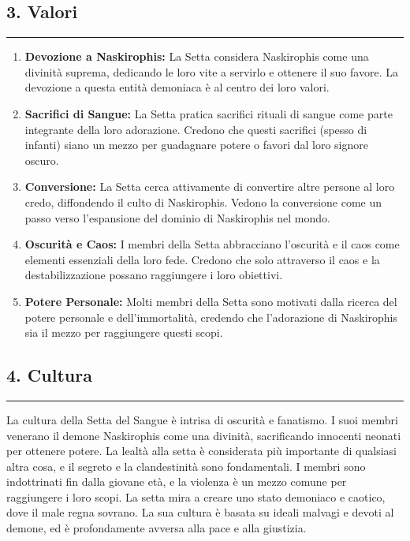 \subsection{3. Valori}\label{valori}

\begin{center}\rule{0.5\linewidth}{0.5pt}\end{center}

\begin{enumerate}
\def\labelenumi{\arabic{enumi}.}
\tightlist
\item
  \textbf{Devozione a Naskirophis:} La Setta considera Naskirophis come
  una divinità suprema, dedicando le loro vite a servirlo e ottenere il
  suo favore. La devozione a questa entità demoniaca è al centro dei
  loro valori.
\item
  \textbf{Sacrifici di Sangue:} La Setta pratica sacrifici rituali di
  sangue come parte integrante della loro adorazione. Credono che questi
  sacrifici (spesso di infanti) siano un mezzo per guadagnare potere o
  favori dal loro signore oscuro.
\item
  \textbf{Conversione:} La Setta cerca attivamente di convertire altre
  persone al loro credo, diffondendo il culto di Naskirophis. Vedono la
  conversione come un passo verso l'espansione del dominio di
  Naskirophis nel mondo.
\item
  \textbf{Oscurità e Caos:} I membri della Setta abbracciano l'oscurità
  e il caos come elementi essenziali della loro fede. Credono che solo
  attraverso il caos e la destabilizzazione possano raggiungere i loro
  obiettivi.
\item
  \textbf{Potere Personale:} Molti membri della Setta sono motivati
  dalla ricerca del potere personale e dell'immortalità, credendo che
  l'adorazione di Naskirophis sia il mezzo per raggiungere questi scopi.
\end{enumerate}

\subsection{4. Cultura}\label{cultura}

\begin{center}\rule{0.5\linewidth}{0.5pt}\end{center}

La cultura della Setta del Sangue è intrisa di oscurità e fanatismo. I
suoi membri venerano il demone Naskirophis come una divinità,
sacrificando innocenti neonati per ottenere potere. La lealtà alla setta
è considerata più importante di qualsiasi altra cosa, e il segreto e la
clandestinità sono fondamentali. I membri sono indottrinati fin dalla
giovane età, e la violenza è un mezzo comune per raggiungere i loro
scopi. La setta mira a creare uno stato demoniaco e caotico, dove il
male regna sovrano. La sua cultura è basata su ideali malvagi e devoti
al demone, ed è profondamente avversa alla pace e alla giustizia.

